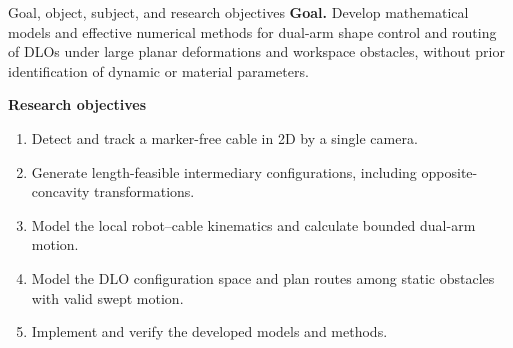 \documentclass[aspectratio=169,10pt]{beamer}
\begin{document}
\begin{frame}[t]{Goal, object, subject, and research objectives}
  \small
  \textbf{Goal.} Develop mathematical models and effective numerical methods
  for dual-arm shape control and routing of DLOs under large planar
  deformations and workspace obstacles, without prior identification of
  dynamic or material parameters.

  \vspace{0.16cm}

      \textbf{Research objectives}
      \begin{enumerate}
        \item Detect and track a marker-free cable in 2D by a single camera.
        \item Generate length-feasible intermediary configurations, including
          opposite-concavity transformations.
        \item Model the local robot--cable kinematics and calculate bounded
          dual-arm motion.
        \item Model the DLO configuration space and plan routes among static
          obstacles with valid swept motion.
        \item Implement and verify the developed models and methods.
      \end{enumerate}

\end{frame}
\end{document}
